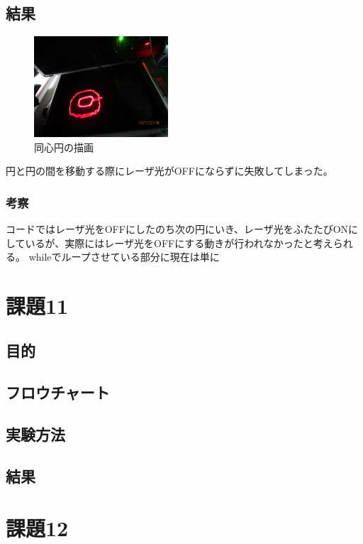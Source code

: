 \documentclass{jarticle}
\begin{document}
\subsection{結果}

\begin{figure}[H]
    \centering
    \includegraphics[width=5cm]{IMG_2154.JPG}
    \caption{同心円の描画}
    \label{fig:my_label}
\end{figure}

円と円の間を移動する際にレーザ光がOFFにならずに失敗してしまった。


\subsubsection{考察}

コードではレーザ光をOFFにしたのち次の円にいき、レーザ光をふたたびONにしているが、実際にはレーザ光をOFFにする動きが行われなかったと考えられる。
whileでループさせている部分に現在は単に

\section{課題11}

\subsection{目的}

\subsection{フロウチャート}

\subsection{実験方法}

\subsection{結果}




\section{課題12}
\end{document}
